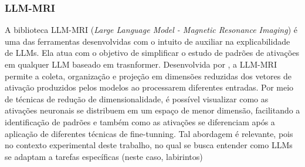 \documentclass[12pt]{article}
\begin{document}
\subsubsection{LLM-MRI}

A biblioteca LLM-MRI (\textit{Large Language Model - Magnetic Resonance Imaging}) é uma das ferramentas desenvolvidas com o intuito de auxiliar na explicabilidade de LLMs. Ela atua com o objetivo de simplificar o estudo de padrões de ativações em qualquer LLM baseado em trasnformer. Desenvolvida por \cite{ref:llm-mri}, a LLM-MRI permite a coleta, organização e projeção em dimensões reduzidas dos vetores de ativação produzidos pelos modelos ao processarem diferentes entradas. Por meio de técnicas de redução de dimensionalidade, é possível visualizar como as ativações neuronais se distribuem em um espaço de menor dimensão, facilitando a identificação de padrões e também como as ativações se diferenciam após a aplicação de diferentes técnicas de fine-tunning. Tal abordagem é relevante, pois no contexto experimental deste trabalho, no qual se busca entender como LLMs se adaptam a tarefas específicas (neste caso, labirintos) 





\end{document}
